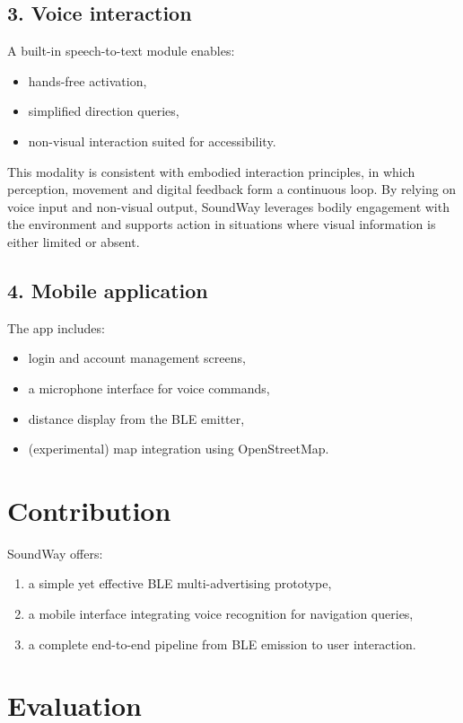 \documentclass[sigconf]{acmart}
\begin{document}
\subsection{3. Voice interaction}
A built-in speech-to-text module enables:
\begin{itemize}
    \item hands-free activation,
    \item simplified direction queries,
    \item non-visual interaction suited for accessibility.
\end{itemize}

This modality is consistent with embodied interaction principles, in which perception, 
movement and digital feedback form a continuous loop. By relying on voice input and 
non-visual output, SoundWay leverages bodily engagement with the environment and 
supports action in situations where visual information is either limited or absent.

\subsection{4. Mobile application}
The app includes:
\begin{itemize}
    \item login and account management screens,
    \item a microphone interface for voice commands,
    \item distance display from the BLE emitter,
    \item (experimental) map integration using OpenStreetMap.
\end{itemize}

\section{Contribution}

SoundWay offers:
\begin{enumerate}
    \item a simple yet effective BLE multi-advertising prototype,
    \item a mobile interface integrating voice recognition for navigation queries,
    \item a complete end-to-end pipeline from BLE emission to user interaction.
\end{enumerate}

\section{Evaluation}
\end{document}
